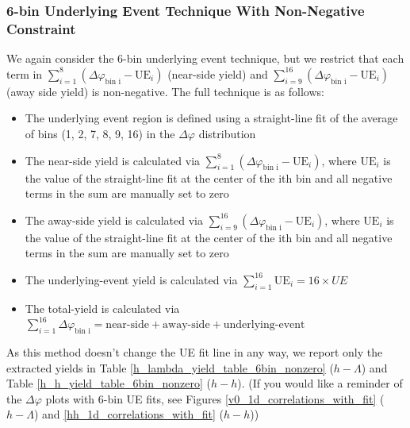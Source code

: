 \documentclass[ALICE,manyauthors]{ALICE_analysis_notes}
\begin{document}
\clearpage

\subsubsection{6-bin Underlying Event Technique With Non-Negative Constraint}
\label{6binnonneg}
We again consider the 6-bin underlying event technique, but we restrict that each term in $\sum_{i=1}^{8} (\Delta\varphi_\text{bin i} - \text{UE}_i)$ (near-side yield) and $\sum_{i=9}^{16} (\Delta\varphi_\text{bin i} - \text{UE}_i)$ (away side yield) is non-negative. The full technique is as follows:

\begin{itemize}
\item The underlying event region is defined using a straight-line fit of the average of bins (1, 2, 7, 8, 9, 16) in the $\Delta\varphi$ distribution
\item The near-side yield is calculated via $\sum_{i=1}^{8} (\Delta\varphi_\text{bin i} - \text{UE}_i)$, where $\text{UE}_i$ is the value of the straight-line fit at the center of the ith bin and all negative terms in the sum are manually set to zero
\item The away-side yield is calculated via $\sum_{i=9}^{16} (\Delta\varphi_\text{bin i} - \text{UE}_i)$, where $\text{UE}_i$ is the value of the straight-line fit at the center of the ith bin and all negative terms in the sum are manually set to zero
\item The underlying-event yield is calculated via $\sum_{i=1}^{16} \text{UE}_i = 16 \times UE$
\item The total-yield is calculated via $\sum_{i=1}^{16} \Delta\varphi_\text{bin i} = \text{near-side} + \text{away-side} + \text{underlying-event}$
\end{itemize}

As this method doesn't change the UE fit line in any way, we report only the extracted yields in Table \ref{h_lambda_yield_table_6bin_nonzero} ($h-\Lambda$) and Table \ref{h_h_yield_table_6bin_nonzero} ($h-h$). (If you would like a reminder of the $\Delta\varphi$ plots with 6-bin UE fits, see Figures \ref{v0_1d_correlations_with_fit} ($h-\Lambda$) and \ref{hh_1d_correlations_with_fit} ($h-h$))
\end{document}
